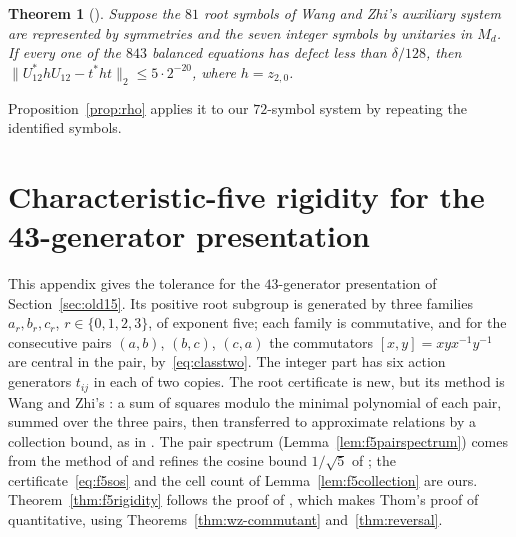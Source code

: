 \documentclass[11pt]{article}
\newtheorem{theorem}{Theorem}[section]
\begin{document}
\begin{theorem}[{\cite[Theorem~5.2]{WangZhi26}}]\label{thm:reflection}
Suppose the $81$ root symbols of Wang and Zhi's auxiliary system are represented by symmetries and the seven integer symbols by unitaries in $M_d$.  If every one of the $843$ balanced equations has defect less than $\delta/128$, then $\|U_{12}^*hU_{12}-t^*ht\|_2\le5\cdot2^{-20}$, where $h=z_{2,0}$.
\end{theorem}
Proposition~\ref{prop:rho} applies it to our $72$-symbol system by repeating the identified symbols.

\section{Characteristic-five rigidity for the 43-generator presentation}\label{sec:f5rigidity}

This appendix gives the tolerance for the $43$-generator presentation of Section~\ref{sec:old15}.  Its positive root subgroup is generated by three families $a_r,b_r,c_r$, $r\in\{0,1,2,3\}$, of exponent five; each family is commutative, and for the consecutive pairs $(a,b)$, $(b,c)$, $(c,a)$ the commutators $[x,y]=xyx^{-1}y^{-1}$ are central in the pair, by~\eqref{eq:classtwo}.  The integer part has six action generators $t_{ij}$ in each of two copies.  The root certificate is new, but its method is Wang and Zhi's \cite[Propositions~3.1 and~3.2]{WangZhi26}: a sum of squares modulo the minimal polynomial of each pair, summed over the three pairs, then transferred to approximate relations by a collection bound, as in \cite[(3.7)]{WangZhi26}.  The pair spectrum (Lemma~\ref{lem:f5pairspectrum}) comes from the method of \cite{EJZ10} and refines the cosine bound $1/\sqrt5$ of \cite[Lemma~B.1]{MghirbiDouglasV1}; the certificate~\eqref{eq:f5sos} and the cell count of Lemma~\ref{lem:f5collection} are ours.  Theorem~\ref{thm:f5rigidity} follows the proof of \cite[Theorem~5.2]{WangZhi26}, which makes Thom's proof of \cite[Theorem~1.3]{Thom26} quantitative, using Theorems~\ref{thm:wz-commutant} and~\ref{thm:reversal}.
\end{document}
